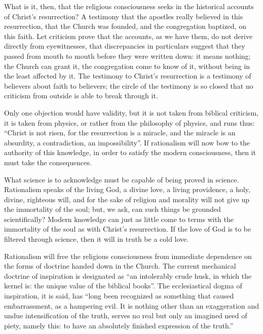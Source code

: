 \documentclass[12pt,a4paper,openany]{book}
\newcommand{\opage}[1]{\marginnote{\footnotesize\textit{[#1]}}}
\begin{document}
What is it, then, that the religious consciousness seeks in
the historical accounts of Christ's resurrection? A
testimony that the apostles really believed in
this resurrection, that the Church was founded, and the congregation
baptized, on this faith. Let criticism prove that the accounts,
as we have them, do not derive directly
from eyewitnesses, that discrepancies in particulars
suggest that they passed from mouth to mouth before they
\setcounter{footnote}{0}%
\opage{106}were written down: it means nothing; the Church can grant
it, the congregation come to know of it, without being in the least
affected by it. The testimony to Christ's resurrection
is a testimony of believers about faith to
believers; the circle of the testimony is so closed that no
criticism from outside is able to break through it.

Only one objection would have validity, but it
is not taken from biblical criticism, it is taken from physics,
or rather from the philosophy of physics, and runs thus:
``Christ is not risen, for the resurrection is a
miracle, and the miracle is an absurdity, a contradiction,
an impossibility''. If rationalism will now bow to
the authority of this knowledge, in order to satisfy the modern
consciousness, then it must take the consequences.

What science is to acknowledge must be capable of being
proved in science. Rationalism speaks of the
living God, a divine love, a living
providence, a holy, divine, righteous will, and
for the sake of religion and morality will not give up
the immortality of the soul; but, we ask, can such things
be grounded scientifically? Modern knowledge can
just as little come to terms with the immortality of the soul
as with Christ's resurrection. If the love of God is to be
filtered through science, then it will in truth be a
cold love.

Rationalism will free the religious consciousness
from immediate dependence on the forms of doctrine handed down
in the Church. The current mechanical doctrine of inspiration
is designated as ``an intolerably crude husk,
in which the kernel is: the unique value of the biblical books''.
The ecclesiastical dogma of inspiration, it is said, has ``long
been recognized as something that caused embarrassment,
\setcounter{footnote}{0}%
\opage{107}as a hampering evil. It is nothing other than an
exaggeration and undue intensification of the truth,
serves no real but only an imagined need
of piety, namely this: to have an absolutely finished
expression of the truth.''
\end{document}
